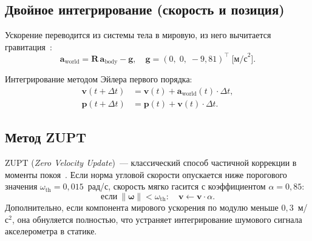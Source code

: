 \documentclass[../main.tex]{subfiles}
\begin{document}
\subsection{Двойное интегрирование (скорость и позиция)}
 
Ускорение переводится из системы тела в мировую, из него вычитается
гравитация~\cite{groves2013}:
\begin{equation}
    \mathbf{a}_\mathrm{world} = \mathbf{R}\,\mathbf{a}_\mathrm{body}
    - \mathbf{g}, \quad
    \mathbf{g} = (0,\;0,\;{-}9{,}81)^\top \;\text{[м/с}^2\text{]}.
    \label{eq:aworld}
\end{equation}
 
Интегрирование методом Эйлера первого порядка:
\begin{align}
    \mathbf{v}(t{+}\Delta t) &= \mathbf{v}(t) +
        \mathbf{a}_\mathrm{world}(t)\cdot\Delta t, \label{eq:vel}\\
    \mathbf{p}(t{+}\Delta t) &= \mathbf{p}(t) +
        \mathbf{v}(t)\cdot\Delta t. \label{eq:pos}
\end{align}
 
\subsection{Метод ZUPT}
 
ZUPT (\textit{Zero Velocity Update})~--- классический способ частичной
коррекции в моменты покоя~\cite{skog2010}. Если норма угловой скорости
опускается ниже порогового значения $\omega_\mathrm{th}=0{,}015$~рад/с,
скорость мягко гасится с коэффициентом $\alpha=0{,}85$:
\begin{equation}
    \text{если}\ \|\bm{\omega}\| < \omega_\mathrm{th}:\quad
    \mathbf{v} \leftarrow \mathbf{v}\cdot\alpha.
    \label{eq:zupt}
\end{equation}
Дополнительно, если компонента мирового ускорения по модулю меньше
$0{,}3$~м/с$^2$, она обнуляется полностью, что устраняет интегрирование
шумового сигнала акселерометра в статике.

	
\end{document}
